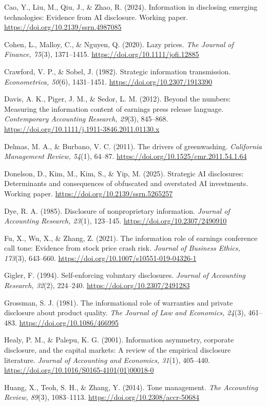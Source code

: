 Cao, Y., Liu, M., Qiu, J., \& Zhao, R. (2024). Information in disclosing emerging technologies: Evidence from AI disclosure. Working paper. \url{https://doi.org/10.2139/ssrn.4987085}

Cohen, L., Malloy, C., \& Nguyen, Q. (2020). Lazy prices. \textit{The Journal of Finance, 75}(3), 1371--1415. \url{https://doi.org/10.1111/jofi.12885}

Crawford, V. P., \& Sobel, J. (1982). Strategic information transmission. \textit{Econometrica, 50}(6), 1431--1451. \url{https://doi.org/10.2307/1913390}

Davis, A. K., Piger, J. M., \& Sedor, L. M. (2012). Beyond the numbers: Measuring the information content of earnings press release language. \textit{Contemporary Accounting Research, 29}(3), 845--868. \url{https://doi.org/10.1111/j.1911-3846.2011.01130.x}

Delmas, M. A., \& Burbano, V. C. (2011). The drivers of greenwashing. \textit{California Management Review, 54}(1), 64--87. \url{https://doi.org/10.1525/cmr.2011.54.1.64}

Donelson, D., Kim, M., Kim, S., \& Yip, M. (2025). Strategic AI disclosures: Determinants and consequences of obfuscated and overstated AI investments. Working paper. \url{https://doi.org/10.2139/ssrn.5265257}

Dye, R. A. (1985). Disclosure of nonproprietary information. \textit{Journal of Accounting Research, 23}(1), 123--145. \url{https://doi.org/10.2307/2490910}

Fu, X., Wu, X., \& Zhang, Z. (2021). The information role of earnings conference call tone: Evidence from stock price crash risk. \textit{Journal of Business Ethics, 173}(3), 643--660. \url{https://doi.org/10.1007/s10551-019-04326-1}

Gigler, F. (1994). Self-enforcing voluntary disclosures. \textit{Journal of Accounting Research, 32}(2), 224--240. \url{https://doi.org/10.2307/2491283}

Grossman, S. J. (1981). The informational role of warranties and private disclosure about product quality. \textit{The Journal of Law and Economics, 24}(3), 461--483. \url{https://doi.org/10.1086/466995}

Healy, P. M., \& Palepu, K. G. (2001). Information asymmetry, corporate disclosure, and the capital markets: A review of the empirical disclosure literature. \textit{Journal of Accounting and Economics, 31}(1), 405--440. \url{https://doi.org/10.1016/S0165-4101(01)00018-0}

Huang, X., Teoh, S. H., \& Zhang, Y. (2014). Tone management. \textit{The Accounting Review, 89}(3), 1083--1113. \url{https://doi.org/10.2308/accr-50684}

